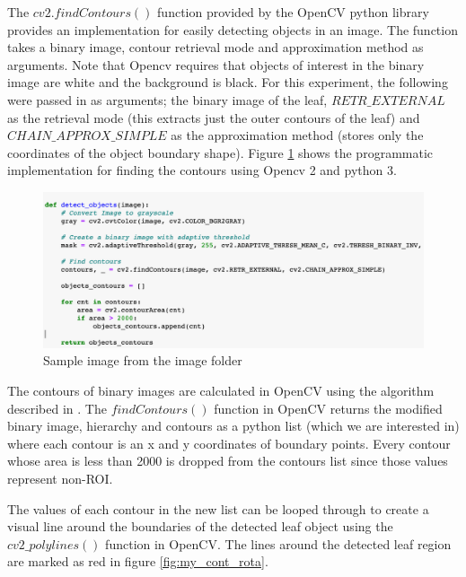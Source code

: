 The $cv2.findContours()$ function provided by the OpenCV python library provides an implementation for easily detecting objects in an image. The function takes a binary image, contour retrieval mode and approximation method as arguments. Note that Opencv requires that objects of interest in the binary image are white and the background is black. For this experiment, the following were passed in as arguments; the binary image of the leaf, $RETR\_EXTERNAL$ as the retrieval mode (this extracts just the outer contours of the leaf) and $CHAIN\_APPROX\_SIMPLE$ as the approximation method (stores only the coordinates of the object boundary shape). Figure \ref{fig:my_detect_obj} shows the programmatic implementation for finding the contours using Opencv 2 and python 3.
\begin{figure}[!htb]
    \centering
    \includegraphics[scale=0.55, keepaspectratio]{Figures/detect_obj.png}
    \caption{Sample image from the image folder}
    \label{fig:my_detect_obj}
\end{figure} 

The contours of binary images are calculated in OpenCV using the algorithm described in \cite{whyna}. The $findContours()$ function in OpenCV returns the modified binary image, hierarchy and contours as a python list (which we are interested in) where each contour is an x and y coordinates of boundary points. 
Every contour whose area is less than 2000 is dropped from the contours list since those values represent non-ROI.


The values of each contour in the new list can be looped through to create a visual line around the boundaries of the detected leaf object using the $cv2\_polylines()$ function in OpenCV. The lines around the detected leaf region are marked as red in figure \ref{fig:my_cont_rota}. 

